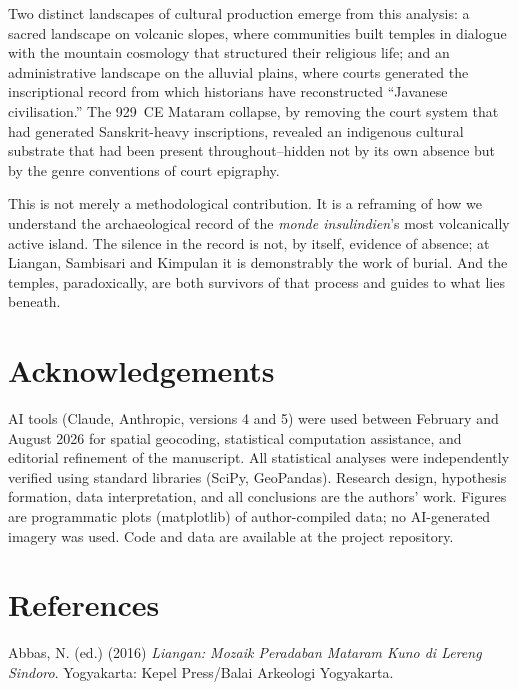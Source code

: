 \documentclass[12pt,a4paper]{article}
\begin{document}
Two distinct landscapes of cultural production emerge from this analysis: a sacred landscape on volcanic slopes, where communities built temples in dialogue with the mountain cosmology that structured their religious life; and an administrative landscape on the alluvial plains, where courts generated the inscriptional record from which historians have reconstructed ``Javanese civilisation.''
The 929~CE Mataram collapse, by removing the court system that had generated Sanskrit-heavy inscriptions, revealed an indigenous cultural substrate that had been present throughout--hidden not by its own absence but by the genre conventions of court epigraphy.

This is not merely a methodological contribution.
It is a reframing of how we understand the archaeological record of the \emph{monde insulindien}'s most volcanically active island.
The silence in the record is not, by itself, evidence of absence; at Liangan, Sambisari and Kimpulan it is demonstrably the work of burial.
And the temples, paradoxically, are both survivors of that process and guides to what lies beneath.

\section*{Acknowledgements}

\noindent AI tools (Claude, Anthropic, versions 4 and 5) were used between February and August 2026 for spatial geocoding, statistical computation assistance, and editorial refinement of the manuscript. All statistical analyses were independently verified using standard libraries (SciPy, GeoPandas). Research design, hypothesis formation, data interpretation, and all conclusions are the authors' work. Figures are programmatic plots (matplotlib) of author-compiled data; no AI-generated imagery was used. Code and data are available at the project repository.


\section*{References}

\noindent Abbas, N. (ed.) (2016) \emph{Liangan: Mozaik Peradaban Mataram Kuno di Lereng Sindoro}. Yogyakarta: Kepel Press/Balai Arkeologi Yogyakarta.
\end{document}
